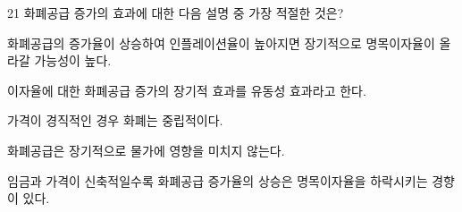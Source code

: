 \begin{question}{21}
화폐공급 증가의 효과에 대한 다음 설명 중 가장 적절한 것은?
\begin{choices}
  \item 화폐공급의 증가율이 상승하여 인플레이션율이 높아지면 장기적으로 명목이자율이 올라갈 가능성이 높다.
  \item 이자율에 대한 화폐공급 증가의 장기적 효과를 유동성 효과라고 한다.
  \item 가격이 경직적인 경우 화폐는 중립적이다.
  \item 화폐공급은 장기적으로 물가에 영향을 미치지 않는다.
  \item 임금과 가격이 신축적일수록 화폐공급 증가율의 상승은 명목이자율을 하락시키는 경향이 있다.
\end{choices}
\end{question}
